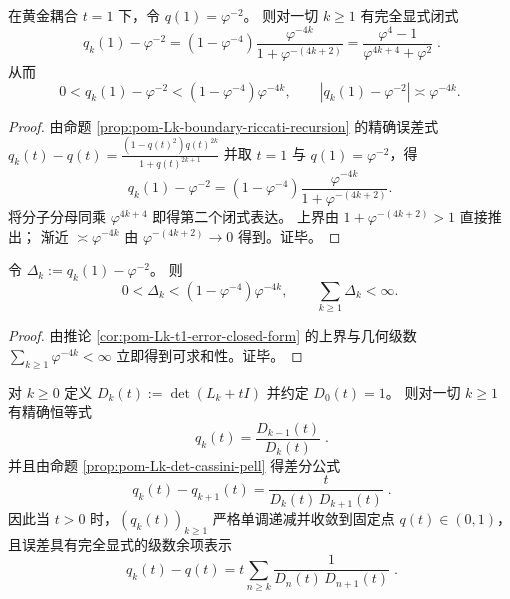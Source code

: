 \begin{corollary}[黄金耦合 \texorpdfstring{$t=1$}{t=1} 的边界反射误差闭式]\label{cor:pom-Lk-t1-error-closed-form}
在黄金耦合 \(t=1\) 下，令 \(q(1)=\varphi^{-2}\)。
则对一切 \(k\ge 1\) 有完全显式闭式
\begin{equation}\label{eq:pom-Lk-t1-error-closed-form}
\boxed{\;
q_k(1)-\varphi^{-2}
=(1-\varphi^{-4})\frac{\varphi^{-4k}}{1+\varphi^{-(4k+2)}}
=\frac{\varphi^4-1}{\varphi^{4k+4}+\varphi^{2}}\; }.
\end{equation}
从而
\[
0<q_k(1)-\varphi^{-2}<(1-\varphi^{-4})\varphi^{-4k},
\qquad
|q_k(1)-\varphi^{-2}|\asymp \varphi^{-4k}.
\]
\end{corollary}
\begin{proof}
由命题 \ref{prop:pom-Lk-boundary-riccati-recursion} 的精确误差式
\(
q_k(t)-q(t)=\frac{(1-q(t)^2)q(t)^{2k}}{1+q(t)^{2k+1}}
\)
并取 \(t=1\) 与 \(q(1)=\varphi^{-2}\)，得
\[
q_k(1)-\varphi^{-2}
=(1-\varphi^{-4})\frac{\varphi^{-4k}}{1+\varphi^{-(4k+2)}}.
\]
将分子分母同乘 \(\varphi^{4k+4}\) 即得第二个闭式表达。
上界由 \(1+\varphi^{-(4k+2)}>1\) 直接推出；
渐近 \(\asymp\varphi^{-4k}\) 由 \(\varphi^{-(4k+2)}\to 0\) 得到。证毕。
\end{proof}

\begin{corollary}[黄金层级截断误差的绝对可求和性]\label{cor:pom-Lk-t1-error-summable}
令 \(\Delta_k:=q_k(1)-\varphi^{-2}\)。
则
\[
0<\Delta_k<(1-\varphi^{-4})\varphi^{-4k},
\qquad
\sum_{k\ge 1}\Delta_k<\infty.
\]
\end{corollary}
\begin{proof}
由推论 \ref{cor:pom-Lk-t1-error-closed-form} 的上界与几何级数
\(
\sum_{k\ge 1}\varphi^{-4k}<\infty
\)
立即得到可求和性。证毕。
\end{proof}

\begin{corollary}\label{cor:pom-Lk-riccati-error-by-determinants}
对 \(k\ge 0\) 定义 \(D_k(t):=\det(L_k+tI)\) 并约定 \(D_0(t)=1\)。
则对一切 \(k\ge 1\) 有精确恒等式
\[
\boxed{\;
q_k(t)=\frac{D_{k-1}(t)}{D_k(t)}\; }.
\]
并且由命题 \ref{prop:pom-Lk-det-cassini-pell} 得差分公式
\[
\boxed{\;
q_k(t)-q_{k+1}(t)=\frac{t}{D_k(t)\,D_{k+1}(t)}\; }.
\]
因此当 \(t>0\) 时，\((q_k(t))_{k\ge 1}\) 严格单调递减并收敛到固定点 \(q(t)\in(0,1)\)，且误差具有完全显式的级数余项表示
\[
\boxed{\;
q_k(t)-q(t)=t\sum_{n\ge k}\frac{1}{D_n(t)\,D_{n+1}(t)}\; }.
\]
\end{corollary}

